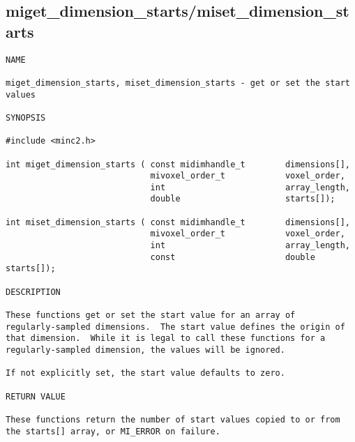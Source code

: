 \documentclass{article}
\begin{document}
\subsection{miget\_dimension\_starts/miset\_dimension\_starts}
\begin{verbatim}
NAME

miget_dimension_starts, miset_dimension_starts - get or set the start
values

SYNOPSIS

#include <minc2.h>

int miget_dimension_starts ( const midimhandle_t        dimensions[],
                             mivoxel_order_t            voxel_order,
                             int                        array_length,
                             double                     starts[]);
      
int miset_dimension_starts ( const midimhandle_t        dimensions[],
                             mivoxel_order_t            voxel_order,
                             int                        array_length,
                             const                      double starts[]);

DESCRIPTION

These functions get or set the start value for an array of
regularly-sampled dimensions.  The start value defines the origin of
that dimension.  While it is legal to call these functions for a
regularly-sampled dimension, the values will be ignored.

If not explicitly set, the start value defaults to zero.

RETURN VALUE

These functions return the number of start values copied to or from
the starts[] array, or MI_ERROR on failure.
\end{verbatim}
\end{document}

